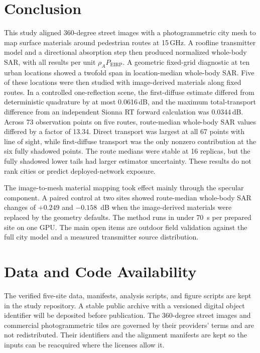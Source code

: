 \documentclass{ieeeaccess}
\begin{document}
\section{Conclusion}\label{sec:conclusion}

This study aligned 360-degree street images with a photogrammetric city mesh to
map surface materials around pedestrian routes at 15\,GHz. A roofline
transmitter model and a directional absorption step then produced normalized
whole-body SAR, with all results per unit $\rho_A P_{\mathrm{EIRP}}$. A
geometric fixed-grid diagnostic at ten urban locations showed a twofold span in
location-median whole-body SAR. Five of these locations were then studied with
image-derived materials along fixed routes. In a controlled one-reflection
scene, the first-diffuse estimate differed from deterministic quadrature by at
most 0.0616\,dB, and the maximum total-transport difference from an independent
Sionna RT forward calculation was 0.0344\,dB. Across 73 observation points on
five routes, route-median whole-body SAR values differed by a factor of 13.34.
Direct transport was largest at all 67 points with line of sight, while
first-diffuse transport was the only nonzero contribution at the six fully
shadowed points. The route medians were stable at 16 replicas, but the fully
shadowed lower tails had larger estimator uncertainty. These results do not rank
cities or predict deployed-network exposure.

The image-to-mesh material mapping took effect mainly through the specular
component. A paired control at two sites showed route-median whole-body SAR
changes of $+0.249$ and $-0.158$~dB when the image-derived materials were
replaced by the geometry defaults. The method runs in under 70~s per prepared
site on one GPU. The main open items are outdoor field validation against the
full city model and a measured transmitter source distribution.

\section*{Data and Code Availability}

The verified five-site data, manifests, analysis scripts, and figure scripts
are kept in the study repository. A stable public archive with a versioned
digital object identifier will be deposited before publication. The 360-degree
street images and commercial photogrammetric tiles are governed by their
providers' terms and are not redistributed. Their identifiers and the alignment
manifests are kept so the inputs can be reacquired where the licenses allow it.
\end{document}
